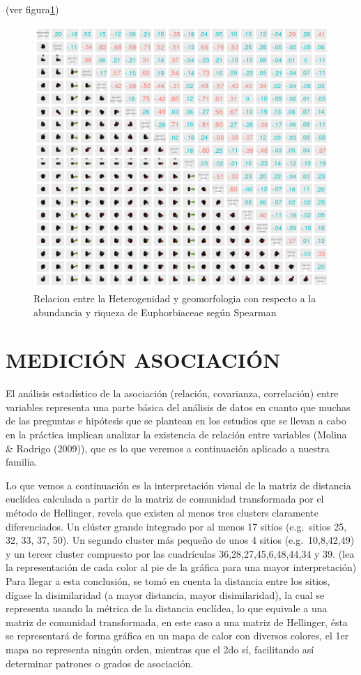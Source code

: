\documentclass[11pt,]{article}
\begin{document}
(ver figura\ref{fig:spearman})

\begin{figure}
\centering
\includegraphics{spearman.png}
\caption{\label{fig:spearman}Relacion entre la Heterogenidad y
geomorfologia con respecto a la abundancia y riqueza de Euphorbiaceae
según Spearman}
\end{figure}

\section{MEDICIÓN ASOCIACIÓN}\label{mediciuxf3n-asociaciuxf3n}

El análisis estadístico de la asociación (relación, covarianza,
correlación) entre variables representa una parte básica del análisis de
datos en cuanto que muchas de las preguntas e hipótesis que se plantean
en los estudios que se llevan a cabo en la práctica implican analizar la
existencia de relación entre variables (Molina \& Rodrigo (2009)), que
es lo que veremos a continuación aplicado a nuestra familia.

Lo que vemos a continuación es la interpretación visual de la matriz de
distancia euclídea calculada a partir de la matriz de comunidad
transformada por el método de Hellinger, revela que existen al menos
tres clusters claramente diferenciados. Un clúster grande integrado por
al menos 17 sitios (e.g.~sitios 25, 32, 33, 37, 50). Un segundo cluster
más pequeño de unos 4 sitios (e.g.~10,8,42,49) y un tercer cluster
compuesto por las cuadrículas 36,28,27,45,6,48,44,34 y 39. (lea la
representación de cada color al pie de la gráfica para una mayor
interpretación) Para llegar a esta conclusión, se tomó en cuenta la
distancia entre los sitios, dígase la disimilaridad (a mayor distancia,
mayor disimilaridad), la cual se representa usando la métrica de la
distancia euclídea, lo que equivale a una matriz de comunidad
transformada, en este caso a una matriz de Hellinger, ésta se
representará de forma gráfica en un mapa de calor con diversos colores,
el 1er mapa no representa ningún orden, mientras que el 2do sí,
facilitando así determinar patrones o grados de asociación.
\end{document}
